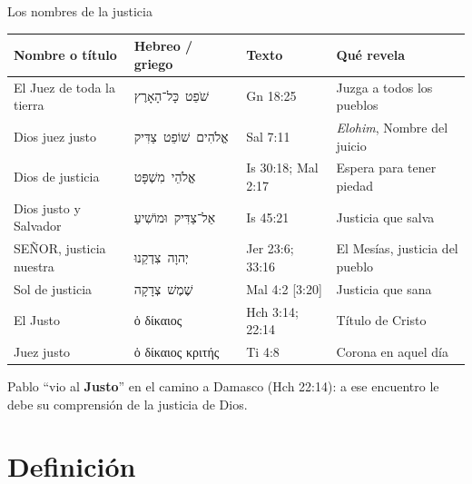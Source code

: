 \documentclass[hyperref={bookmarks=false},aspectratio=169]{beamer}
\newcommand{\heb}[1]{\mbox{\foreignlanguage{hebrew}{#1}}}
\newcommand{\grc}[1]{\foreignlanguage{ancientgreek}{#1}}
\newcommand{\SENOR}{S{\fontsize{0.78em}{1em}\selectfont EÑOR}}
\newcommand{\destacar}[1]{\textbf{\textcolor{azul}{#1}}}
\begin{document}
\begin{frame}{Los nombres de la justicia}
\scriptsize\renewcommand{\arraystretch}{1.15}
\begin{tabular}{@{}>{\RaggedRight\arraybackslash}p{3.1cm}>{\RaggedRight\arraybackslash}p{3.0cm}>{\RaggedRight\arraybackslash}p{2.0cm}>{\RaggedRight\arraybackslash}p{3.4cm}@{}}
\toprule
\textbf{Nombre o título} & \textbf{Hebreo / griego} & \textbf{Texto} & \textbf{Qué revela} \\ \midrule
El Juez de toda la tierra & \heb{שֹׁפֵט כָּל־הָאָרֶץ} & Gn 18:25 & Juzga a todos los pueblos \\
Dios juez justo & \heb{אֱלֹהִים שׁוֹפֵט צַדִּיק} & Sal 7:11 & \emph{Elohim}, Nombre del juicio \\
Dios de justicia & \heb{אֱלֹהֵי מִשְׁפָּט} & Is 30:18; Mal 2:17 & Espera para tener piedad \\
Dios justo y Salvador & \heb{אֵל־צַדִּיק וּמוֹשִׁיעַ} & Is 45:21 & Justicia que salva \\
\SENOR, justicia nuestra & \heb{יְהוָה צִדְקֵנוּ} & Jer 23:6; 33:16 & El Mesías, justicia del pueblo \\
Sol de justicia & \heb{שֶׁמֶשׁ צְדָקָה} & Mal 4:2 [3:20] & Justicia que sana \\
El Justo & \grc{ὁ δίκαιος} & Hch 3:14; 22:14 & Título de Cristo \\
Juez justo & \grc{ὁ δίκαιος κριτής} & 2 Ti 4:8 & Corona en aquel día \\
\bottomrule
\end{tabular}\par\medskip
\small Pablo ``vio al \destacar{Justo}'' en el camino a Damasco (Hch 22:14): a ese encuentro le debe su comprensión de la justicia de Dios.
\end{frame}

\section{Definición}
\end{document}
